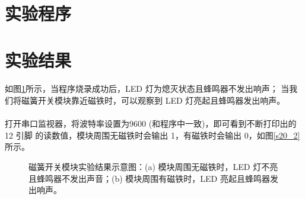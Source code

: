 \documentclass[UTF8, oneside]{ctexbook}
\begin{document}
\section{实验程序}


\section{实验结果}
\paragraph{}
如图\ref{s20_1}所示，当程序烧录成功后，LED 灯为熄灭状态且蜂鸣器不发出响声；
当我们将磁簧开关模块靠近磁铁时，可以观察到 LED 灯亮起且蜂鸣器发出响声。

\paragraph{}
打开串口监视器，将波特率设置为9600 (和程序中一致)，即可看到不断打印出的 12 引脚
的读数值，模块周围无磁铁时会输出 1，有磁铁时会输出 0，如图\ref{s20_2}所示。
\newpage

\begin{figure}[h]
    \centering


    \centering
    \caption{磁簧开关模块实验结果示意图：(a) 模块周围无磁铁时，LED 灯不亮
    且蜂鸣器不发出声音；(b) 模块周围有磁铁时，LED 亮起且蜂鸣器发出响声。}
    \label{s20_1}
    
\end{figure}
\end{document}
